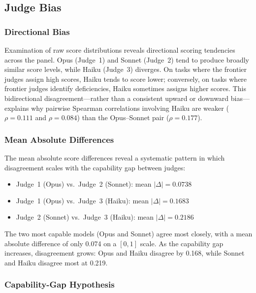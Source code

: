 \documentclass[11pt]{article}
\begin{document}
\subsection{Judge Bias}
\label{sec:judge_bias}

\subsubsection{Directional Bias}

Examination of raw score distributions reveals directional scoring tendencies
across the panel. Opus (Judge~1) and Sonnet (Judge~2) tend to produce broadly
similar score levels, while Haiku (Judge~3) diverges. On tasks where the
frontier judges assign high scores, Haiku tends to score lower; conversely,
on tasks where frontier judges identify deficiencies, Haiku sometimes assigns
higher scores. This bidirectional disagreement---rather than a consistent
upward or downward bias---explains why pairwise Spearman correlations
involving Haiku are weaker ($\rho = 0.111$ and $\rho = 0.084$) than the
Opus--Sonnet pair ($\rho = 0.177$).

\subsubsection{Mean Absolute Differences}

The mean absolute score differences reveal a systematic pattern in which
disagreement scales with the capability gap between judges:

\begin{itemize}
  \item Judge~1 (Opus) vs.\ Judge~2 (Sonnet): mean $|\Delta| = 0.0738$
  \item Judge~1 (Opus) vs.\ Judge~3 (Haiku): mean $|\Delta| = 0.1683$
  \item Judge~2 (Sonnet) vs.\ Judge~3 (Haiku): mean $|\Delta| = 0.2186$
\end{itemize}

The two most capable models (Opus and Sonnet) agree most closely, with a mean
absolute difference of only 0.074 on a $[0, 1]$ scale. As the capability gap
increases, disagreement grows: Opus and Haiku disagree by 0.168, while Sonnet
and Haiku disagree most at 0.219.

\subsubsection{Capability-Gap Hypothesis}
\end{document}
